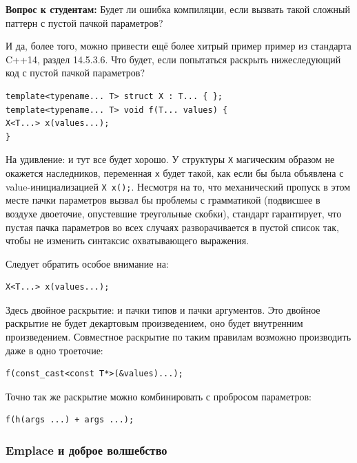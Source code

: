 \documentclass[a4paper,12pt,oneside]{article}
\newif\ifanswers
\begin{document}
\ifanswers
Правильный ответ: открытым, поскольку \lstinline!pattern = public Mixins!
\fi

\textbf{Вопрос к студентам:} Будет ли ошибка компиляции, если вызвать такой сложный паттерн с пустой пачкой параметров?

\ifanswers
Правильный ответ: все будет хорошо.
\fi

И да, более того, можно привести ещё более хитрый пример пример из стандарта C++14, раздел 14.5.3.6. Что будет, если попытаться раскрыть нижеследующий код с пустой пачкой параметров?

\begin{lstlisting}
template<typename... T> struct X : T... { };
template<typename... T> void f(T... values) {
X<T...> x(values...);
}
\end{lstlisting}

На удивление: и тут все будет хорошо. У структуры \lstinline!X! магическим образом не окажется наследников, переменная \lstinline!x! будет такой, как если бы была объявлена с value-инициализацией \lstinline!X x();!. Несмотря на то, что механический пропуск в этом месте пачки параметров вызвал бы проблемы с грамматикой (подвисшее в воздухе двоеточие, опустевшие треугольные скобки), стандарт гарантирует, что пустая пачка параметров во всех случаях разворачивается в пустой список так, чтобы не изменить синтаксис охватывающего выражения.

Следует обратить особое внимание на:

\begin{lstlisting}
X<T...> x(values...);
\end{lstlisting}

Здесь двойное раскрытие: и пачки типов и пачки аргументов. Это двойное раскрытие не будет декартовым произведением, оно будет внутренним произведением. Совместное раскрытие по таким правилам возможно производить даже в одно троеточие:

\begin{lstlisting}
f(const_cast<const T*>(&values)...); 
\end{lstlisting}

Точно так же раскрытие можно комбинировать с пробросом параметров:

\begin{lstlisting}
f(h(args ...) + args ...);
\end{lstlisting}

\subsubsection{Emplace и доброе волшебство}\label{subsub:Emplace}
\end{document}

